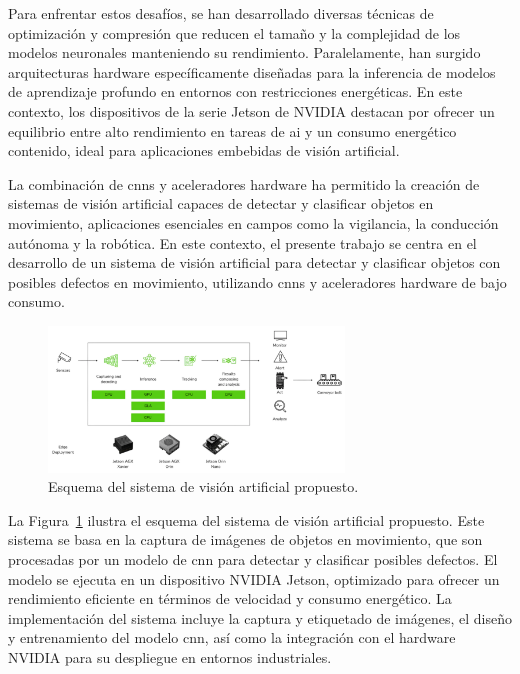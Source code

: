 \documentclass[11pt,spanish,listoffigures,listoftables]{tfgetsinf}
\begin{document}
Para enfrentar estos desafíos, se han desarrollado diversas técnicas de optimización y compresión que reducen el tamaño y la complejidad de los modelos neuronales manteniendo su rendimiento. Paralelamente, han surgido arquitecturas hardware específicamente diseñadas para la inferencia de modelos de aprendizaje profundo en entornos con restricciones energéticas. En este contexto, los dispositivos de la serie Jetson de NVIDIA\cite{nvidia_jetson_modules} destacan por ofrecer un equilibrio entre alto rendimiento en tareas de \gls{ai} y un consumo energético contenido, ideal para aplicaciones embebidas de visión artificial.

La combinación de \glspl{cnn} y aceleradores hardware ha permitido la creación de sistemas de visión artificial capaces de detectar y clasificar objetos en movimiento, aplicaciones esenciales en campos como la vigilancia, la conducción autónoma y la robótica. En este contexto, el presente trabajo se centra en el desarrollo de un sistema de visión artificial para detectar y clasificar objetos con posibles defectos en movimiento, utilizando \glspl{cnn} y aceleradores hardware de bajo consumo.

\begin{figure}[H]
   \centering
   \includegraphics[width=0.7\textwidth]{images/diseno_e_implementacion/figura_TFG_v3.png}
   \caption[Esquema del sistema de visión artificial propuesto]{Esquema del sistema de visión artificial propuesto.}
\label{fig:esquema_TFG}
\end{figure}

La Figura~\ref{fig:esquema_TFG} ilustra el esquema del sistema de visión artificial propuesto. Este sistema se basa en la captura de imágenes de objetos en movimiento, que son procesadas por un modelo de \gls{cnn} para detectar y clasificar posibles defectos. El modelo se ejecuta en un dispositivo NVIDIA Jetson, optimizado para ofrecer un rendimiento eficiente en términos de velocidad y consumo energético. La implementación del sistema incluye la captura y etiquetado de imágenes, el diseño y entrenamiento del modelo \gls{cnn}, así como la integración con el hardware NVIDIA para su despliegue en entornos industriales.
\end{document}
